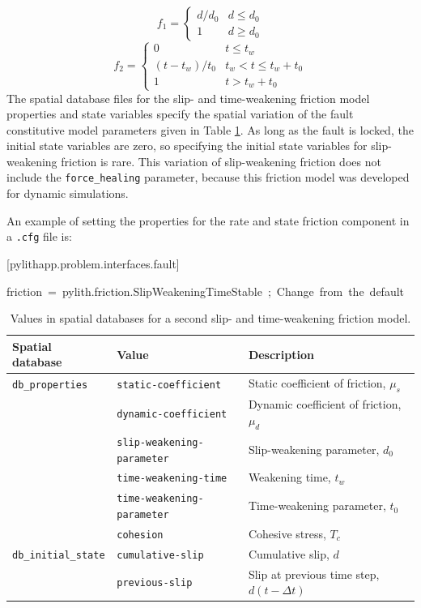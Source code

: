 \begin{equation}
f_{1}=\begin{cases}
d/d_{0} & d\leq d_{0}\\
1 & d\ge d_{0}
\end{cases}
\end{equation}
\begin{equation}
f_{2}=\begin{cases}
0 & t\leq t_{w}\\
(t-t_{w})/t_{0} & t_{w}<t\le t_{w}+t_{0}\\
1 & t>t_{w}+t_{0}
\end{cases}
\end{equation}
The spatial database files for the slip- and time-weakening friction
model properties and state variables specify the spatial variation
of the fault constitutive model parameters given in Table \ref{tab:slip:time:stable:weakening:properties:statevars}.
As long as the fault is locked, the initial state variables are zero,
so specifying the initial state variables for slip-weakening friction
is rare. This variation of slip-weakening friction does not include
the \texttt{force\_healing} parameter, because this friction model
was developed for dynamic simulations.

An example of setting the properties for the rate and state friction
component in a \texttt{.cfg} file is:
\begin{lyxcode}
{[}pylithapp.problem.interfaces.fault{]}

friction~=~pylith.friction.SlipWeakeningTimeStable~;~Change~from~the~default


\end{lyxcode}
\noindent \begin{center}
\begin{table}[H]
\noindent \centering{}\caption{\label{tab:slip:time:stable:weakening:properties:statevars}Values
in spatial databases for a second slip- and time-weakening friction
model.}
\medskip{}
\begin{tabular}{|l|l|>{\raggedright}p{2.5in}|}
\hline 
\textbf{Spatial database} & \textbf{Value} & \textbf{Description}\tabularnewline
\hline 
\hline 
\texttt{db\_properties} & \texttt{static-coefficient} & Static coefficient of friction, $\mu_{s}$\tabularnewline
\cline{2-3} 
 & \texttt{dynamic-coefficient} & Dynamic coefficient of friction, $\mu_{d}$\tabularnewline
\cline{2-3} 
 & \texttt{slip-weakening-parameter} & Slip-weakening parameter, $d_{0}$\tabularnewline
\cline{2-3} 
 & \texttt{time-weakening-time} & Weakening time, $t_{w}$\tabularnewline
\cline{2-3} 
 & \texttt{time-weakening-parameter} & Time-weakening parameter, $t_{0}$\tabularnewline
\cline{2-3} 
 & \texttt{cohesion} & Cohesive stress, $T_{c}$\tabularnewline
\hline 
\texttt{db\_initial\_state} & \texttt{cumulative-slip} & Cumulative slip, $d$\tabularnewline
\cline{2-3} 
 & \texttt{previous-slip} & Slip at previous time step, $d(t-\Delta t)$\tabularnewline
\hline 
\end{tabular}
\end{table}

\par\end{center}


